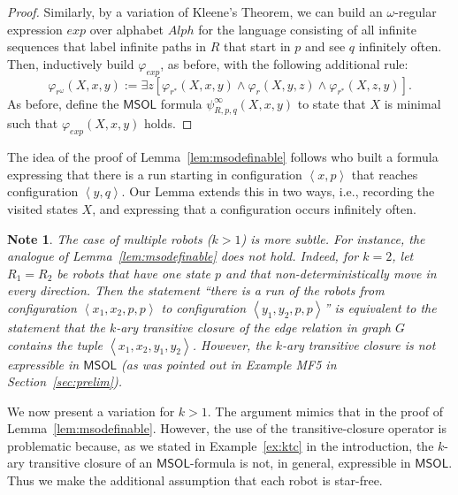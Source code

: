 \documentclass{aamas2015}
\newtheorem{note}{Note}
\newcommand{\tpl}[1]{\left<{#1}\right>}
\def\msol{\mathsf{MSOL}}
\def\fotc{\mathsf{FOL+TC}}
\newcommand{\sr}[1]{\footnote{{\color{red} Note. #1}}}
\begin{document}
\begin{proof}
Similarly, by a variation of Kleene's Theorem, we can build an $\omega$-regular expression $exp$ over alphabet $Alph$ for the language consisting of all infinite sequences that label infinite paths in $R$ that start in $p$ and see $q$ infinitely often. Then, inductively build $\varphi_{exp}$, as before, with the following additional rule: 
\[
\varphi_{r^\omega} (X,x,y) := 
\exists z \left[ \varphi_{r^*}(X,x,y) \wedge \varphi_r(X,y,z) \wedge \varphi_{r^*}(X,z,y)\right].
\]
As before, define the $\msol$ formula $\psi^\infty_{R,p,q}(X,x,y)$ to state that $X$ is minimal such that $\varphi_{exp}(X,x,y)$ holds.
\end{proof}

The idea of the proof of Lemma~\ref{lem:msodefinable} follows \cite{BlEn97} who built a formula expressing that there is a run starting in configuration $\tpl{{x},{p}}$ that reaches configuration $\tpl{{y},{q}}$. Our Lemma extends this in two ways, i.e., recording the visited states $X$, and expressing that a configuration occurs infinitely often.

\begin{note} \label{note:lem1}
The case of multiple robots ($k > 1$) is more subtle. For instance, the analogue of Lemma~\ref{lem:msodefinable} does not hold. Indeed, for $k = 2$, let $R_1 = R_2$ be robots that have one state $p$ and that non-deterministically move in every direction. Then the statement ``there is a run of the robots from configuration $\tpl{x_1,x_2,p,p}$ to configuration $\tpl{y_1,y_2,p,p}$'' is equivalent to the statement that the $k$-ary transitive closure of the edge relation in graph $G$ contains the tuple $\tpl{x_1,x_2,y_1,y_2}$. However, the $k$-ary transitive closure is not expressible in $\msol$ (as was pointed out in Example MF5 in Section~\ref{sec:prelim}). %
\end{note}

\iffalse
We now present a variation for $k > 1$. The argument mimics that in the proof of Lemma~\ref{lem:msodefinable}. However, the use of the transitive-closure operator is problematic because, as we stated in Example~\ref{ex:ktc} in the introduction, the $k$-ary transitive closure of an $\msol$-formula is not, in general, expressible in $\msol$. 
Thus we make the additional assumption that each robot is star-free. 
\end{document}
